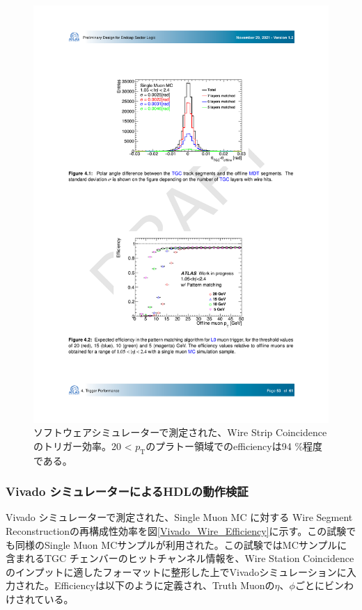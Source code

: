 \begin{figure} 
    \centering
    \includegraphics[width=16cm]{fig/Test/Soft_WS.pdf}
    \caption[ソフトウェアシミュレーターで測定された、Wire Strip Coincidenceのトリガー効率]{ソフトウェアシミュレーターで測定された、Wire Strip Coincidenceのトリガー効率\cite{SLPDR}。20 < $p_\mathrm{T}$のプラトー領域でのefficiencyは94 \%程度である。}
    \label{Soft_WS}
\end{figure}

\subsubsection*{Vivado シミュレーターによるHDLの動作検証}
Vivado シミュレーターで測定された、Single Muon  MC に対する Wire Segment Reconstructionの再構成性効率を図\ref{Vivado_Wire_Efficiency}に示す。この試験でも同様のSingle Muon MCサンプルが利用された。この試験ではMCサンプルに含まれるTGC チェンバーのヒットチャンネル情報を、Wire Station Coincidenceのインプットに適したフォーマットに整形した上でVivadoシミュレーションに入力された。Efficiencyは以下のように定義され、Truth Muonの$\eta$、$\phi$ごとにビンわけされている。

